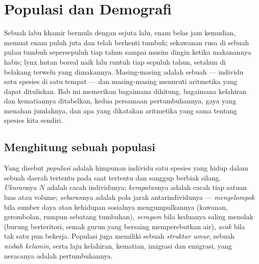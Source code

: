 \chapter{Populasi dan Demografi}\label{ch:b1:populations}

Sebuah labu khamir bermula dengan sejuta  lalu, enam belas jam
kemudian, memuat enam puluh juta dan telah berhenti tumbuh; sekawanan
rusa di sebuah pulau tumbuh sepersepuluh tiap tahun sampai musim
dingin ketika makanannya habis; lynx hutan boreal naik lalu runtuh
tiap sepuluh tahun, setahun di belakang terwelu yang dimakannya.
Masing-masing adalah sebuah \emph{} --- individu satu spesies
di satu tempat --- dan masing-masing menuruti aritmetika yang dapat
dituliskan. Bab ini memerikan bagaimana  dihitung, bagaimana
kelahiran dan kematiannya ditabelkan, kedua persamaan pertumbuhannya,
gaya yang menahan jumlahnya, dan apa yang dikatakan aritmetika yang
sama tentang spesies kita sendiri.

\section{Menghitung sebuah populasi}

\begin{definition}\label{def:b1:populations:population}
Yang disebut \emph{populasi} adalah himpunan individu satu spesies
yang hidup dalam sebuah daerah tertentu pada saat tertentu dan sanggup
berbiak silang. \emph{Ukuran}nya $N$ adalah cacah individunya;
\emph{kerapatan}nya adalah cacah tiap satuan luas atau volume;
\emph{sebaran}nya adalah pola jarak antarindividunya ---
\emph{mengelompok} bila sumber daya atau kehidupan sosialnya
mengumpulkannya (kawanan, gerombolan, rumpun sebatang tumbuhan),
\emph{seragam} bila keduanya saling menolak (burung berteritori, semak
gurun yang bersaing memperebutkan air), \emph{acak} bila tak satu pun
bekerja. Populasi juga memiliki sebuah \emph{struktur umur}, sebuah
\emph{nisbah kelamin}, serta laju kelahiran, kematian, imigrasi dan
emigrasi, yang neracanya adalah pertumbuhannya.
\end{definition}

